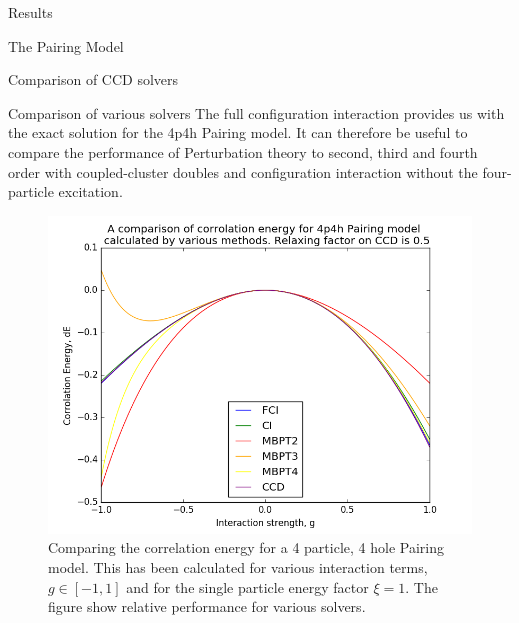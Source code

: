 \documentclass[twoside,english]{uiofysmaster}
\begin{document}
\begin{chapter}{Results}
\begin{section}{The Pairing Model}
\begin{subsection}{Comparison of CCD solvers}
		\end{subsection}
		\begin{subsection}{Comparison of various solvers}
			The full configuration interaction provides us with the exact solution for the 4p4h Pairing model. It can therefore be useful to compare the performance of Perturbation theory to second, third and fourth order with coupled-cluster doubles and configuration interaction without the four-particle excitation. 
			\begin{figure}[H]
				\includegraphics[width=\linewidth]{../Pairing_Model/Results/Figures/Pairing4p4h_CompareDE_AllMethods.png}
				\caption{Comparing the correlation energy for a 4 particle, 4 hole Pairing model. This has been calculated for various interaction terms, $g \in [-1,1]$ and for the single particle energy factor $\xi = 1$. The figure show relative performance for various solvers.}
				\label{figure:CompareCorrelationPairing}
			\end{figure}


\end{subsection}
\end{section}
\end{chapter}
\end{document}
